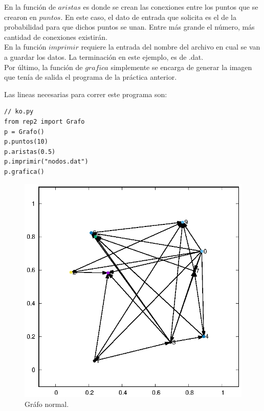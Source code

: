 \documentclass{article}%
\begin{document}
En la funci\'on de $aristas$ es donde se crean las conexiones entre los puntos que se crearon en $puntos$. En este caso, el dato de entrada que solicita es el de la probabilidad para que dichos puntos se unan. Entre m\'as grande el n\'umero, m\'as cantidad de conexiones existir\'an.
\\

En la funci\'on $imprimir$ requiere la entrada del nombre del archivo en cual se van a guardar los datos. La terminaci\'on en este ejemplo, es de .dat.
\\

Por \'ultimo, la funci\'on de $grafica$ simplemente se encarga de generar la imagen que ten\'ia de salida el programa de la pr\'actica anterior.

Las lineas necesarias para correr este programa son:

\begin{lstlisting}
// ko.py
from rep2 import Grafo
p = Grafo()
p.puntos(10)
p.aristas(0.5)
p.imprimir("nodos.dat")
p.grafica()
\end{lstlisting}

\begin{figure}[h]

\centering
\includegraphics[width = 1\textwidth]{nodos1.eps}
\caption{Gr\'afo normal.}
\end{figure}
\end{document}
